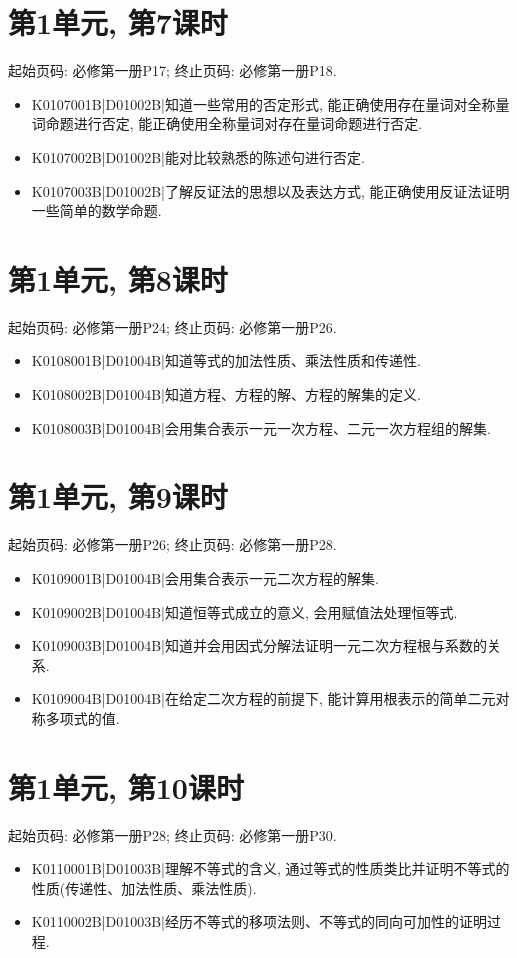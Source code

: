 \section*{第1单元, 第7课时}
起始页码: 必修第一册P17; 终止页码: 必修第一册P18.
\begin{itemize}
\item K0107001B|D01002B|知道一些常用的否定形式, 能正确使用存在量词对全称量词命题进行否定, 能正确使用全称量词对存在量词命题进行否定.
\item K0107002B|D01002B|能对比较熟悉的陈述句进行否定.
\item K0107003B|D01002B|了解反证法的思想以及表达方式, 能正确使用反证法证明一些简单的数学命题.
\end{itemize}

\section*{第1单元, 第8课时}
起始页码: 必修第一册P24; 终止页码: 必修第一册P26.
\begin{itemize}
\item K0108001B|D01004B|知道等式的加法性质、乘法性质和传递性.
\item K0108002B|D01004B|知道方程、方程的解、方程的解集的定义.
\item K0108003B|D01004B|会用集合表示一元一次方程、二元一次方程组的解集.
\end{itemize}

\section*{第1单元, 第9课时}
起始页码: 必修第一册P26; 终止页码: 必修第一册P28.
\begin{itemize}
\item K0109001B|D01004B|会用集合表示一元二次方程的解集.
\item K0109002B|D01004B|知道恒等式成立的意义, 会用赋值法处理恒等式.
\item K0109003B|D01004B|知道并会用因式分解法证明一元二次方程根与系数的关系.
\item K0109004B|D01004B|在给定二次方程的前提下, 能计算用根表示的简单二元对称多项式的值.
\end{itemize}

\section*{第1单元, 第10课时}
起始页码: 必修第一册P28; 终止页码: 必修第一册P30.
\begin{itemize}
\item K0110001B|D01003B|理解不等式的含义, 通过等式的性质类比并证明不等式的性质(传递性、加法性质、乘法性质).
\item K0110002B|D01003B|经历不等式的移项法则、不等式的同向可加性的证明过程.
\end{itemize}

